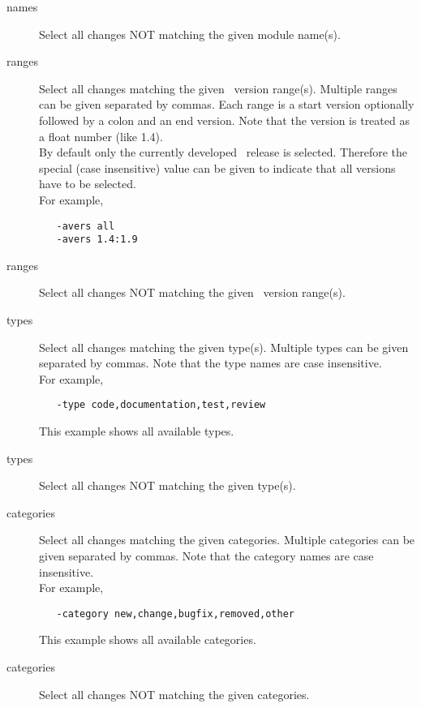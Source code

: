 \begin{description}
\item[ names]
   Select all changes NOT matching the given module name(s).

\item[ ranges]
   Select all changes matching the given \aipspp\ version range(s).
   Multiple ranges can be given separated by commas.
   Each range is a start version optionally followed by a colon and an
   end version. 
   Note that the version is treated as a float number (like 1.4).
   \\By default only the currently developed \aipspp\ release is
   selected. Therefore the special (case insensitive) value
    can be given to indicate that all versions have to be selected.
   \\For example,
\begin{verbatim}
   -avers all
   -avers 1.4:1.9
\end{verbatim}

\item[ ranges]
   Select all changes NOT matching the given \aipspp\ version range(s).

\item[ types]
   Select all changes matching the given type(s).
   Multiple types can be given separated by commas.
   Note that the type names are case insensitive.
   \\For example,
\begin{verbatim}
   -type code,documentation,test,review
\end{verbatim}
   This example shows all available types.

\item[ types]
   Select all changes NOT matching the given type(s).

\item[ categories]
   Select all changes matching the given categories.
   Multiple categories can be given separated by commas.
   Note that the category names are case insensitive.
   \\For example,
\begin{verbatim}
   -category new,change,bugfix,removed,other
\end{verbatim}
   This example shows all available categories.

\item[ categories]
   Select all changes NOT matching the given categories.
\end{description}

